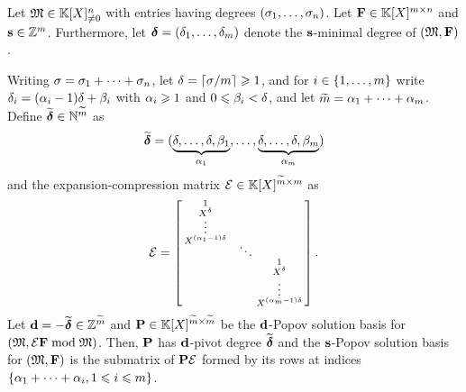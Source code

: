 \documentclass[preprint]{sig-alternate-05-2015}
\begin{document}
\vspace{-0.2cm}
\begin{lem}
  \label{lem:modsys_parlin}
  Let $\Modulus \in \modSpace^\nbeq$ with entries having degrees $(\degMod_1,
  \ldots, \degMod_\nbeq)$. Let $\sys \in \sysSpace$ and $\shifts \in
  \shiftSpace$.  Furthermore, let $\minDegs = (\minDeg_1,\ldots,\minDeg_\nbun)$
  denote the $\shifts$-minimal degree of $(\Modulus,\sys)$.
  
  Writing $\degMod = \degMod_1 + \cdots + \degMod_\nbeq$, let $\degExp = \lceil
  \degMod / \nbun \rceil \ge 1$, and for $i\in\{1,\ldots,\nbun\}$ write
  $\minDeg_i = (\quoExp_i -1) \degExp + \remExp_i$ with $\quoExp_i \ge 1$ and
  $0 \le \remExp_i < \degExp$, and let $\expand{\nbun} = \quoExp_1 + \cdots +
  \quoExp_\nbun$. Define $\expand{\minDegs}\in \NN^{\expand{\nbun}}$ as
  \vspace{-0.2cm}
  \begin{equation}
    \label{eqn:expandMinDegs}
    \expand{\minDegs} = ( \underbrace{\degExp, \ldots, \degExp, \remExp_1}_{\quoExp_1}, \ldots,
    \underbrace{\degExp, \ldots, \degExp, \remExp_\nbun}_{\quoExp_\nbun} )
  \vspace{-0.2cm}
  \end{equation}
  and the expansion-compression matrix $\expandMat \in
  \polMatSpace[\expand{\nbun}][\nbun]$ as
  \vspace{-0.15cm}
  \begin{equation}
    \label{eqn:expandMat}
    \expandMat = 
    \left[\begin{smallmatrix}
      1 \\
      X^\degExp \\[-0.1cm]
      \vdots \\
      X^{(\quoExp_1-1)\degExp} \\[-0.2cm]
      & \;\;\; \ddots \\
      & & 1 \\
      & & X^\degExp \\
      & & \vdots \\
      & & X^{(\quoExp_\nbun-1)\degExp}
  \end{smallmatrix}\right] . 
  \vspace{-0.15cm}
  \end{equation}
  Let $\shifts[d] = - \expand{\minDegs} \in \shiftSpace[\expand{\nbun}]$ and
  $\mat{P} \in \polMatSpace[\expand{\nbun}]$ be the $\shifts[d]$-Popov solution
  basis for $(\Modulus,\expandMat \sys \bmod \Modulus)$.
Then, $\mat{P}$ has $\shifts[d]$-pivot degree $\expand{\minDegs}$ and the
  $\shifts$-Popov solution basis for $(\Modulus,\sys)$ is the submatrix of
  $\mat{P} \expandMat$ formed by its rows at indices
  $\{\quoExp_1+\cdots+\quoExp_i, 1\le i\le \rdim\}$.
\end{lem}
\end{document}
